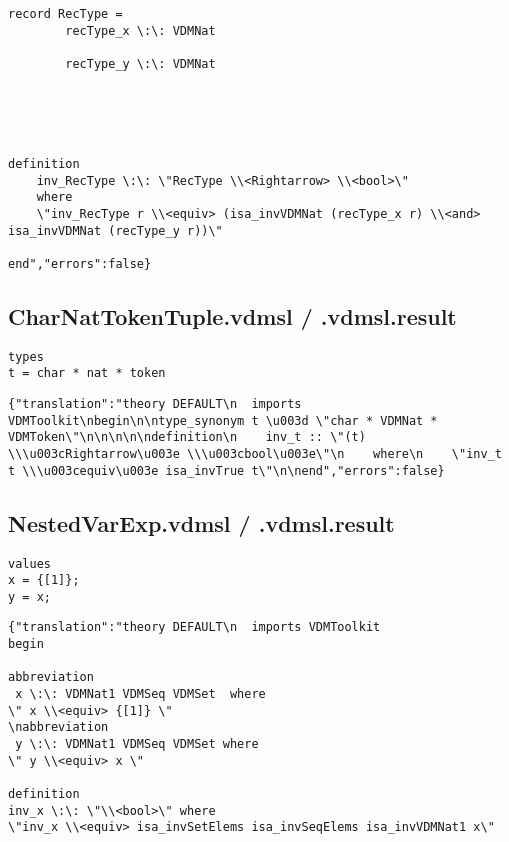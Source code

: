 \begin{appendices}
\begin{lstlisting}
record RecType =
        recType_x \:\: VDMNat

        recType_y \:\: VDMNat

    



definition
    inv_RecType \:\: \"RecType \\<Rightarrow> \\<bool>\"
    where
    \"inv_RecType r \\<equiv> (isa_invVDMNat (recType_x r) \\<and> isa_invVDMNat (recType_y r))\"

end","errors":false}
\end{lstlisting}

\subsection{CharNatTokenTuple.vdmsl / .vdmsl.result} \label{charnat}
\begin{lstlisting}
types
t = char * nat * token
\end{lstlisting}

\begin{lstlisting}
{"translation":"theory DEFAULT\n  imports VDMToolkit\nbegin\n\ntype_synonym t \u003d \"char * VDMNat * VDMToken\"\n\n\n\n\ndefinition\n    inv_t :: \"(t) \\\u003cRightarrow\u003e \\\u003cbool\u003e\"\n    where\n    \"inv_t t \\\u003cequiv\u003e isa_invTrue t\"\n\nend","errors":false}
\end{lstlisting}

\subsection{NestedVarExp.vdmsl / .vdmsl.result}
\begin{lstlisting}
values
x = {[1]};
y = x;

\end{lstlisting}

\begin{lstlisting}
{"translation":"theory DEFAULT\n  imports VDMToolkit
begin

abbreviation
 x \:\: VDMNat1 VDMSeq VDMSet  where 
\" x \\<equiv> {[1]} \" 
\nabbreviation
 y \:\: VDMNat1 VDMSeq VDMSet where 
\" y \\<equiv> x \" 

definition
inv_x \:\: \"\\<bool>\" where
\"inv_x \\<equiv> isa_invSetElems isa_invSeqElems isa_invVDMNat1 x\"


\end{lstlisting}
\end{appendices}
